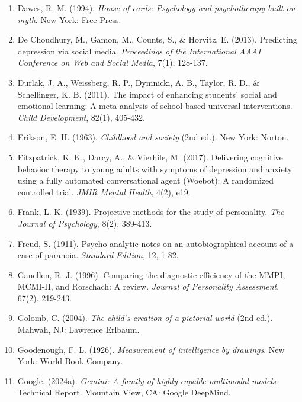 \begin{enumerate}
\item Dawes, R. M. (1994). \textit{House of cards: Psychology and psychotherapy built on myth}. New York: Free Press.

\item De Choudhury, M., Gamon, M., Counts, S., \& Horvitz, E. (2013). Predicting depression via social media. \textit{Proceedings of the International AAAI Conference on Web and Social Media}, 7(1), 128-137.

\item Durlak, J. A., Weissberg, R. P., Dymnicki, A. B., Taylor, R. D., \& Schellinger, K. B. (2011). The impact of enhancing students' social and emotional learning: A meta-analysis of school-based universal interventions. \textit{Child Development}, 82(1), 405-432.

\item Erikson, E. H. (1963). \textit{Childhood and society} (2nd ed.). New York: Norton.

\item Fitzpatrick, K. K., Darcy, A., \& Vierhile, M. (2017). Delivering cognitive behavior therapy to young adults with symptoms of depression and anxiety using a fully automated conversational agent (Woebot): A randomized controlled trial. \textit{JMIR Mental Health}, 4(2), e19.

\item Frank, L. K. (1939). Projective methods for the study of personality. \textit{The Journal of Psychology}, 8(2), 389-413.

\item Freud, S. (1911). Psycho-analytic notes on an autobiographical account of a case of paranoia. \textit{Standard Edition}, 12, 1-82.

\item Ganellen, R. J. (1996). Comparing the diagnostic efficiency of the MMPI, MCMI-II, and Rorschach: A review. \textit{Journal of Personality Assessment}, 67(2), 219-243.

\item Golomb, C. (2004). \textit{The child's creation of a pictorial world} (2nd ed.). Mahwah, NJ: Lawrence Erlbaum.

\item Goodenough, F. L. (1926). \textit{Measurement of intelligence by drawings}. New York: World Book Company.

\item Google. (2024a). \textit{Gemini: A family of highly capable multimodal models}. Technical Report. Mountain View, CA: Google DeepMind.


\end{enumerate}
